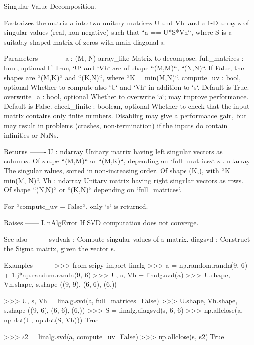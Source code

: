 \begin{DoxyVerb}Singular Value Decomposition.

Factorizes the matrix a into two unitary matrices U and Vh, and
a 1-D array s of singular values (real, non-negative) such that
``a == U*S*Vh``, where S is a suitably shaped matrix of zeros with
main diagonal s.

Parameters
----------
a : (M, N) array_like
    Matrix to decompose.
full_matrices : bool, optional
    If True, `U` and `Vh` are of shape ``(M,M)``, ``(N,N)``.
    If False, the shapes are ``(M,K)`` and ``(K,N)``, where
    ``K = min(M,N)``.
compute_uv : bool, optional
    Whether to compute also `U` and `Vh` in addition to `s`.
    Default is True.
overwrite_a : bool, optional
    Whether to overwrite `a`; may improve performance.
    Default is False.
check_finite : boolean, optional
    Whether to check that the input matrix contains only finite numbers.
    Disabling may give a performance gain, but may result in problems
    (crashes, non-termination) if the inputs do contain infinities or NaNs.

Returns
-------
U : ndarray
    Unitary matrix having left singular vectors as columns.
    Of shape ``(M,M)`` or ``(M,K)``, depending on `full_matrices`.
s : ndarray
    The singular values, sorted in non-increasing order.
    Of shape (K,), with ``K = min(M, N)``.
Vh : ndarray
    Unitary matrix having right singular vectors as rows.
    Of shape ``(N,N)`` or ``(K,N)`` depending on `full_matrices`.

For ``compute_uv = False``, only `s` is returned.

Raises
------
LinAlgError
    If SVD computation does not converge.

See also
--------
svdvals : Compute singular values of a matrix.
diagsvd : Construct the Sigma matrix, given the vector s.

Examples
--------
>>> from scipy import linalg
>>> a = np.random.randn(9, 6) + 1.j*np.random.randn(9, 6)
>>> U, s, Vh = linalg.svd(a)
>>> U.shape, Vh.shape, s.shape
((9, 9), (6, 6), (6,))

>>> U, s, Vh = linalg.svd(a, full_matrices=False)
>>> U.shape, Vh.shape, s.shape
((9, 6), (6, 6), (6,))
>>> S = linalg.diagsvd(s, 6, 6)
>>> np.allclose(a, np.dot(U, np.dot(S, Vh)))
True

>>> s2 = linalg.svd(a, compute_uv=False)
>>> np.allclose(s, s2)
True\end{DoxyVerb}
 \hypertarget{namespacescipy_1_1linalg_1_1decomp__svd_a81400bb2f5c2a09055f82c692fa56df8}{}
